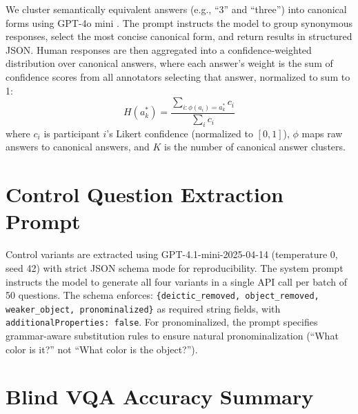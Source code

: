 \documentclass[letterpaper]{article}
\begin{document}
We cluster semantically equivalent answers (e.g., ``3'' and ``three'') into
canonical forms using GPT-4o mini \citep{openai2025gpt4o}. The prompt instructs
the model to group synonymous responses, select the most concise canonical form,
and return results in structured JSON. Human responses are then aggregated into
a confidence-weighted distribution over canonical answers, where each answer's
weight is the sum of confidence scores from all annotators selecting that answer,
normalized to sum to 1:
\begin{equation}
H(a_k^*) = \frac{\sum_{i:\phi(a_i)=a_k^*} c_i}{\sum_i c_i}
\end{equation}
where $c_i$ is participant $i$'s Likert confidence (normalized to $[0,1]$),
$\phi$ maps raw answers to canonical answers, and $K$ is the number of
canonical answer clusters.

\section{Control Question Extraction Prompt}
\label{app:ctl}

Control variants are extracted using GPT-4.1-mini-2025-04-14 (temperature 0,
seed 42) with strict JSON schema mode for reproducibility.
The system prompt instructs the model to generate all four variants in a single
API call per batch of 50 questions. The schema enforces:
\texttt{\{deictic\_removed, object\_removed, weaker\_object, pronominalized\}}
as required string fields, with \texttt{additionalProperties: false}.
For pronominalized, the prompt specifies grammar-aware substitution rules to
ensure natural pronominalization (``What color is it?'' not ``What color is
the object?'').

\section{Blind VQA Accuracy Summary}
\label{app:accuracy}
\end{document}

